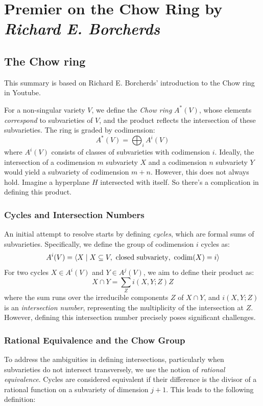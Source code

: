 \documentclass[12pt]{memoir}
\begin{document}
\chapter{Premier on the Chow Ring by \emph{Richard E. Borcherds}}

\section{The Chow ring}

This summary is based on Richard E. Borcherds' introduction to the Chow ring in Youtube.

For a non-singular variety \( V \), we define the \emph{Chow ring} \( A^\ast(V) \), whose elements \emph{correspond} to subvarieties of \( V \), and the product reflects the intersection of these subvarieties. The ring is graded by codimension:
\[
A^\ast(V) = \bigoplus_i A^i(V)
\]
where \( A^i(V) \) consists of classes of subvarieties with codimension \( i \). Ideally, the intersection of a codimension \( m \) subvariety \( X \) and a codimension \( n \) subvariety \( Y \) would yield a subvariety of codimension \( m+n \). However, this does not always hold. Imagine a hyperplane $H$ intersected with itself. So there's a complication in defining this product.

\subsection{Cycles and Intersection Numbers}

An initial attempt to resolve starts by defining \emph{cycles}, which are formal sums of subvarieties. Specifically, we define the group of codimension \( i \) cycles as:
\[
A^i(V) = \left\langle X \mid X \subseteq V, \ \text{closed subvariety}, \ \codim(X) = i \right\rangle
\]
For two cycles \( X \in A^i(V) \) and \( Y \in A^j(V) \), we aim to define their product as:
\[
X \cap Y = \sum_{Z} i(X, Y; Z) Z
\]
where the sum runs over the irreducible components \( Z\) of \( X \cap Y \), and \( i(X, Y; Z) \) is an \emph{intersection number}, representing the multiplicity of the intersection at \( Z \). However, defining this intersection number precisely poses significant challenges.

\subsection{Rational Equivalence and the Chow Group}

To address the ambiguities in defining intersections, particularly when subvarieties do not intersect transversely, we use the notion of \emph{rational equivalence}. Cycles are considered equivalent if their difference is the divisor of a rational function on a subvariety of dimension \( j+1 \). This leads to the following definition:
\end{document}
